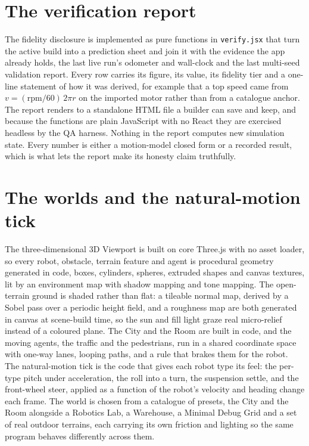 \documentclass[11pt,a4paper]{report}
\begin{document}
\section{The verification report}
\label{sec:verreport}
The fidelity disclosure is implemented as pure functions in \texttt{verify.jsx} that turn the active build into a prediction sheet and join it with the evidence the app already holds, the last live run's odometer and wall-clock and the last multi-seed validation report. Every row carries its figure, its value, its fidelity tier and a one-line statement of how it was derived, for example that a top speed came from $v = (\mathrm{rpm}/60)\,2\pi r$ on the imported motor rather than from a catalogue anchor. The report renders to a standalone HTML file a builder can save and keep, and because the functions are plain JavaScript with no React they are exercised headless by the QA harness. Nothing in the report computes new simulation state. Every number is either a motion-model closed form or a recorded result, which is what lets the report make its honesty claim truthfully.

\section{The worlds and the natural-motion tick}
The three-dimensional 3D Viewport is built on core Three.js with no asset loader, so every robot, obstacle, terrain feature and agent is procedural geometry generated in code, boxes, cylinders, spheres, extruded shapes and canvas textures, lit by an environment map with shadow mapping and tone mapping. The open-terrain ground is shaded rather than flat: a tileable normal map, derived by a Sobel pass over a periodic height field, and a roughness map are both generated in canvas at scene-build time, so the sun and fill light graze real micro-relief instead of a coloured plane. The City and the Room are built in code, and the moving agents, the traffic and the pedestrians, run in a shared coordinate space with one-way lanes, looping paths, and a rule that brakes them for the robot. The natural-motion tick is the code that gives each robot type its feel: the per-type pitch under acceleration, the roll into a turn, the suspension settle, and the front-wheel steer, applied as a function of the robot's velocity and heading change each frame. The world is chosen from a catalogue of presets, the City and the Room alongside a Robotics Lab, a Warehouse, a Minimal Debug Grid and a set of real outdoor terrains, each carrying its own friction and lighting so the same program behaves differently across them.
\end{document}
